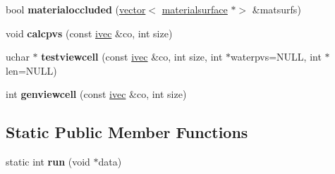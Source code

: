 \begin{DoxyCompactItemize}
bool {\bfseries materialoccluded} (\hyperlink{structvector}{vector}$<$ \hyperlink{structmaterialsurface}{materialsurface} $\ast$$>$ \&matsurfs)
\item 
\mbox{\label{structpvsworker_abf3053dafe349d6b77f3a67f3757ec66}} 
void {\bfseries calcpvs} (const \hyperlink{structivec}{ivec} \&co, int size)
\item 
\mbox{\label{structpvsworker_ad8d14d50790f2f640300ee0a01e1667f}} 
uchar $\ast$ {\bfseries testviewcell} (const \hyperlink{structivec}{ivec} \&co, int size, int $\ast$waterpvs=N\+U\+LL, int $\ast$len=N\+U\+LL)
\item 
\mbox{\label{structpvsworker_aba83dfd92f1932034d241e44e4fd5d6d}} 
int {\bfseries genviewcell} (const \hyperlink{structivec}{ivec} \&co, int size)
\end{DoxyCompactItemize}
\subsection*{Static Public Member Functions}
\begin{DoxyCompactItemize}
\item 
\mbox{\label{structpvsworker_a54d7629e110196e76f51956906b4a6e0}} 
static int {\bfseries run} (void $\ast$data)
\end{DoxyCompactItemize}
